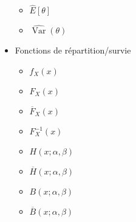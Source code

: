 \documentclass{article}
\newcommand{\pdf}[2]{{f}_{#1}\left(#2\right)}
\newcommand{\cdf}[2]{{F}_{#1}\left(#2\right)}
\newcommand{\sur}[2]{{\overline{F}}_{#1}\left(#2\right)}
\newcommand{\inv}[2]{{F}_{#1}^{-1}\left(#2\right)}
\newcommand{\pgamma}[3]{H\left(#1; #2, #3\right)}
\newcommand{\sgamma}[3]{\overline{H}\left(#1; #2, #3\right)}
\newcommand{\pbeta}[3]{B\left(#1; #2, #3\right)}
\newcommand{\sbeta}[3]{\overline{B}\left(#1; #2, #3\right)}
\newcommand{\hesp}[1]{\widehat{E} \left[ #1 \right]}
\newcommand{\hvar}[1]{\widehat{\operatorname{Var}} \left( #1 \right)}
\begin{document}
\begin{itemize}
\begin{itemize}
        \item $\hesp{\theta}$
        \item $\hvar{\theta}$
    \end{itemize}
    \item Fonctions de répartition/survie
    \begin{itemize}
        \item $\pdf{X}{x}$
        \item $\cdf{X}{x}$
        \item $\sur{X}{x}$
        \item $\inv{X}{x}$
        \item $\pgamma{x}{\alpha}{\beta}$
        \item $\sgamma{x}{\alpha}{\beta}$
        \item $\pbeta{x}{\alpha}{\beta}$
        \item $\sbeta{x}{\alpha}{\beta}$
    \end{itemize}
\end{itemize}
\end{document}
